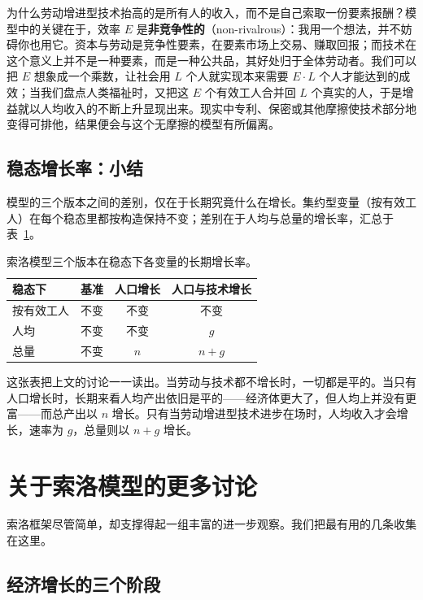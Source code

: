\begin{remark}[作为公共品的技术]
为什么劳动增进型技术抬高的是所有人的收入，而不是自己索取一份要素报酬？模型中的关键在于，效率 $E$ 是\textbf{非竞争性的}（non-rivalrous）：我用一个想法，并不妨碍你也用它。资本与劳动是竞争性要素，在要素市场上交易、赚取回报；而技术在这个意义上并不是一种要素，而是一种公共品，其好处归于全体劳动者。我们可以把 $E$ 想象成一个乘数，让社会用 $L$ 个人就实现本来需要 $E \cdot L$ 个人才能达到的成效；当我们盘点人类福祉时，又把这 $E$ 个有效工人合并回 $L$ 个真实的人，于是增益就以人均收入的不断上升显现出来。现实中专利、保密或其他摩擦使技术部分地变得可排他，结果便会与这个无摩擦的模型有所偏离。
\end{remark}

\subsection{稳态增长率：小结}

模型的三个版本之间的差别，仅在于长期究竟什么在增长。集约型变量（按有效工人）在每个稳态里都按构造保持不变；差别在于人均与总量的增长率，汇总于表~\ref{tab:solow-summary}。

\begin{table}[h]
\centering
\caption{索洛模型三个版本在稳态下各变量的长期增长率。}
\label{tab:solow-summary}
\begin{tabular}{@{}lccc@{}}
\toprule
稳态下 & 基准 & 人口增长 & 人口与技术增长 \\
\midrule
按有效工人 & 不变 & 不变 & 不变 \\
人均 & 不变 & 不变 & $g$ \\
总量 & 不变 & $n$ & $n + g$ \\
\bottomrule
\end{tabular}
\end{table}

这张表把上文的讨论一一读出。当劳动与技术都不增长时，一切都是平的。当只有人口增长时，长期来看人均产出依旧是平的——经济体更大了，但人均上并没有更富——而总产出以 $n$ 增长。只有当劳动增进型技术进步在场时，人均收入才会增长，速率为 $g$，总量则以 $n + g$ 增长。

\section{关于索洛模型的更多讨论}

索洛框架尽管简单，却支撑得起一组丰富的进一步观察。我们把最有用的几条收集在这里。

\subsection{经济增长的三个阶段}

